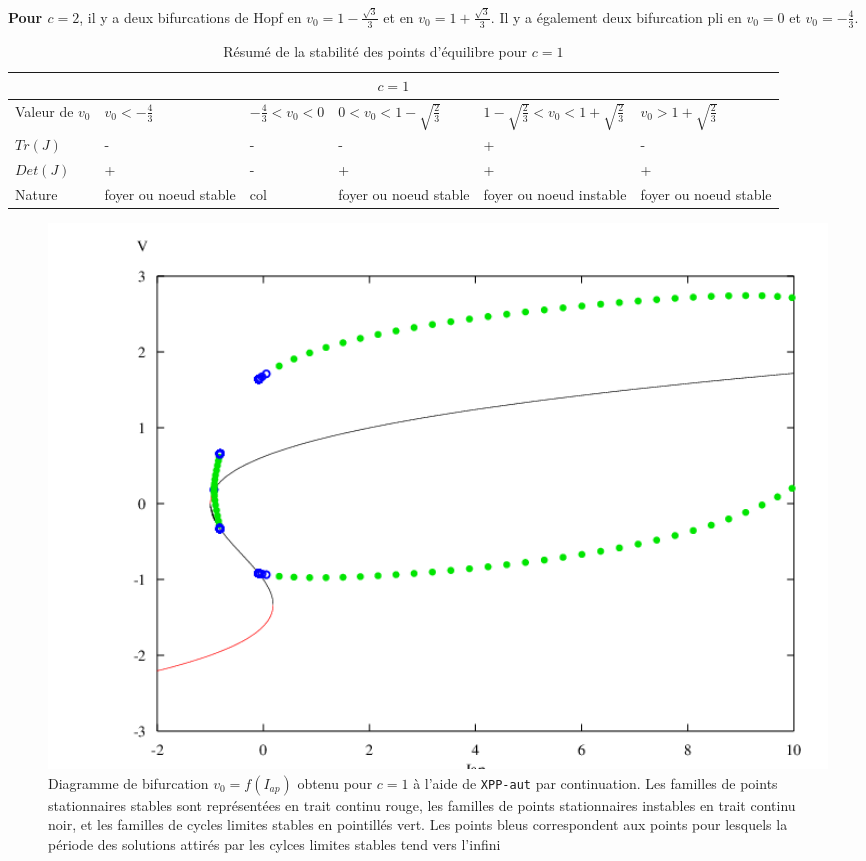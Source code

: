 \documentclass[12pt,a4paper,onecolumn]{article}
\begin{document}
\textbf{Pour $c=2$}, il y a deux bifurcations de Hopf en $v_0 = 1 - \frac{\sqrt{3}}{3}$ et en $v_0 = 1 + \frac{\sqrt{3}}{3}$. Il y a également deux bifurcation pli en $v_0 = 0$ et $v_0 = -\frac{4}{3}$.

\newpage

\begin{table}[H]
\begin{tabular}{|L{2.2cm} | C{2cm} | C{2.5cm} | C{2.5cm} |C{2.5cm}|C{2.5cm}|}
\hline
{}
\\\hline
Valeur de $v_0$ & $v_0 < - \frac{4}{3}$ & $- \frac{4}{3} < v_0 < 0$ & $0 < v_0 < 1 - \sqrt{\frac{2}{3}}$ & $1 - \sqrt{\frac{2}{3}} < v_0 < 1 + \sqrt{\frac{2}{3}}$ &$v_0 > 1 + \sqrt{\frac{2}{3}}$ \\
 \hline
$Tr(J)$ & - & - & - & + & - \\ \hline
$Det(J)$ & + & - & + & + &+ \\ \hline
Nature & foyer ou noeud stable  & col & foyer ou noeud stable & foyer ou noeud instable & foyer ou noeud stable \\ \hline
\end{tabular}
\caption{Résumé de la stabilité des points d'équilibre pour $c = 1$}
\label{resume_c_2}
\end{table}

\begin{figure}[H]
\begin{center}
\includegraphics[width = 1.0\textwidth]{bif_10.png}
\end{center}
\caption{Diagramme de bifurcation $v_0=f(I_{ap})$ obtenu pour $c=1$ à l'aide de \texttt{XPP-aut} par continuation. Les familles de points stationnaires stables sont représentées en trait continu rouge, les familles de points stationnaires instables en trait continu noir, et les familles de cycles limites stables en pointillés vert. Les points bleus correspondent aux points pour lesquels la période des solutions attirés par les cylces limites stables tend vers l'infini}
\label{fig_res_c_1}
\end{figure}
\end{document}
